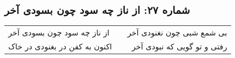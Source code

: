 \begin{center}
\section*{شماره ۲۷: از ناز چه سود چون بسودی آخر}
\label{sec:027}
\begin{longtable}{l p{0.5cm} r}
از ناز چه سود چون بسودی آخر
&&
بی شمع شبی چون نغنودی آخر
\\
اکنون به کفن در بغنودی در خاک
&&
رفتی و تو گویی که نبودی آخر
\\
\end{longtable}
\end{center}
